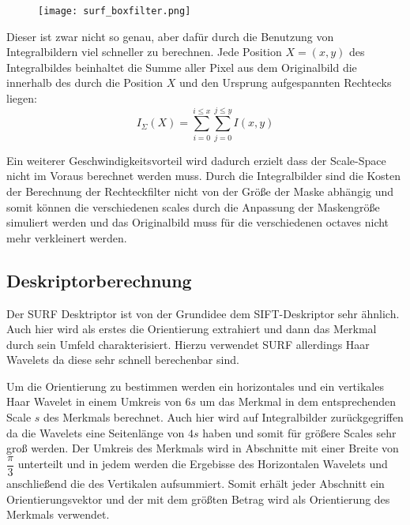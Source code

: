 \begin{figure}[h]
\texttt{[image: surf\_boxfilter.png]}
\centering
\end{figure}

Dieser ist zwar nicht so genau, aber dafür durch die Benutzung von Integralbildern viel schneller zu berechnen.
Jede Position $X=(x, y)$ des Integralbildes beinhaltet die Summe aller Pixel aus dem Originalbild die innerhalb des durch die Position $X$ und den Ursprung aufgespannten Rechtecks liegen:
\begin{equation}
I_\Sigma(X)=\sum_{i=0}^{i\leq x}\sum_{j=0}^{j\leq y}I(x,y)
\end{equation}

Ein weiterer Geschwindigkeitsvorteil wird dadurch erzielt dass der Scale-Space nicht im Voraus berechnet werden muss. Durch die Integralbilder sind die Kosten der Berechnung der Rechteckfilter nicht von der Größe der Maske abhängig und somit können die verschiedenen \Glspl{scale} durch die Anpassung der Maskengröße simuliert werden und das Originalbild muss für die verschiedenen \Glspl{octave} nicht mehr verkleinert werden.

\subsection{Deskriptorberechnung}

Der SURF Desktriptor ist von der Grundidee dem SIFT-Deskriptor sehr ähnlich.
Auch hier wird als erstes die Orientierung extrahiert und dann das Merkmal durch sein Umfeld charakterisiert.
Hierzu verwendet SURF allerdings Haar Wavelets da diese sehr schnell berechenbar sind.

Um die Orientierung zu bestimmen werden ein horizontales und ein vertikales Haar Wavelet in einem Umkreis von $6s$ um das Merkmal in dem entsprechenden Scale $s$ des Merkmals berechnet.
Auch hier wird auf Integralbilder zurückgegriffen da die Wavelets eine Seitenlänge von $4s$ haben und somit für größere Scales sehr groß werden.
Der Umkreis des Merkmals wird in Abschnitte mit einer Breite von $\dfrac{\pi}{3}$ unterteilt und in jedem werden die Ergebisse des Horizontalen Wavelets und anschließend die des Vertikalen aufsummiert.
Somit erhält jeder Abschnitt ein Orientierungsvektor und der mit dem größten Betrag wird als Orientierung des Merkmals verwendet.

